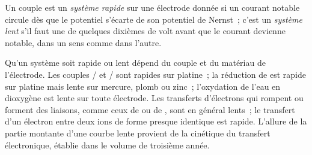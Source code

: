 \begin{definition}\label{def:b2:current-potential-curves:fast-slow}
Un couple est un \emph{système rapide} sur une électrode donnée si un
courant notable circule dès que le potentiel s'écarte de son potentiel de
Nernst~; c'est un \emph{système lent} s'il faut une  de
quelques dixièmes de volt avant que le courant devienne notable, dans
un sens comme dans l'autre.
\end{definition}

Qu'un système soit rapide ou lent dépend du couple et du matériau de
l'électrode. Les couples / et / sont rapides sur
platine~; la réduction de  est rapide sur platine mais lente sur mercure,
plomb ou zinc~; l'oxydation de l'eau en dioxygène est lente sur toute électrode.
Les transferts d'électrons qui rompent ou forment des liaisons, comme ceux de  ou de ,
sont en général lents~; le transfert d'un électron entre deux ions de forme presque
identique est rapide. L'allure de la partie montante d'une courbe lente provient de
la cinétique du transfert électronique, établie dans le volume de troisième année.

